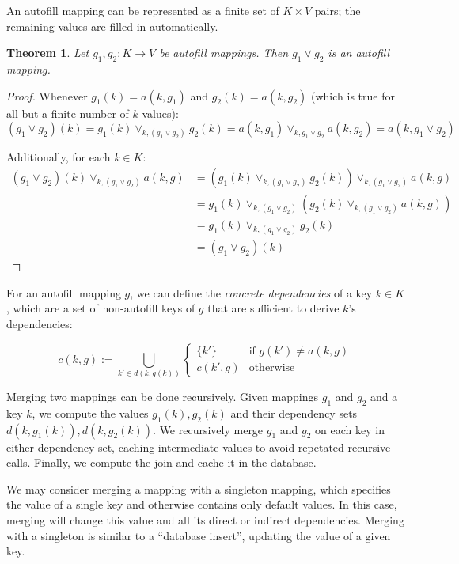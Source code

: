 \documentclass{article}
\newtheorem{theorem}{Theorem}
\begin{document}
        An autofill mapping can be represented as a finite set of $K \times V$ pairs; the remaining values are filled in automatically.

        \begin{theorem}
          Let $g_1, g_2 : K \rightarrow V$ be autofill mappings. Then $g_1 \vee g_2$ is an autofill mapping.
        \end{theorem}

        \begin{proof}

          Whenever $g_1(k) = a(k, g_1)$ and $g_2(k) = a(k, g_2)$ (which is true for all but a finite number of $k$ values):
           $$(g_1 \vee g_2)(k) = g_1(k) \vee_{k, (g_1 \vee g_2)} g_2(k) = a(k, g_1) \vee_{k, g_1 \vee g_2} a(k, g_2) = a(k, g_1 \vee g_2)$$

          Additionally, for each $k \in K$:
          \begin{align*}
            (g_1 \vee g_2)(k) \vee_{k, (g_1 \vee g_2)} a(k, g) 
            &= (g_1(k) \vee_{k, (g_1 \vee g_2)} g_2(k)) \vee_{k, (g_1 \vee g_2)} a(k, g) \\
            &= g_1(k) \vee_{k, (g_1 \vee g_2)} (g_2(k) \vee_{k, (g_1 \vee g_2)} a(k, g)) \\
            &= g_1(k) \vee_{k, (g_1 \vee g_2)} g_2(k) \\
            &= (g_1 \vee g_2)(k)
          \end{align*}
        \end{proof}

        For an autofill mapping $g$, we can define the \emph{concrete dependencies} of a key $k \in K$, which are a set of non-autofill keys of $g$ that are sufficient to derive $k$'s dependencies:

        $$c(k, g) := \bigcup_{k' \in d(k, g(k))} \begin{cases}
          \{k'\} & \text{if } g(k') \neq a(k, g) \\
          c(k', g) & \text{otherwise}
        \end{cases}  $$


        Merging two mappings can be done recursively. Given mappings $g_1$ and $g_2$ and a key $k$, we compute the values $g_1(k), g_2(k)$ and their dependency sets $d(k, g_1(k)), d(k, g_2(k))$. We recursively merge $g_1$ and $g_2$ on each key in either dependency set, caching intermediate values to avoid repetated recursive calls. Finally, we compute the join and cache it in the database.

        We may consider merging a mapping with a singleton mapping, which specifies the value of a single key and otherwise contains only default values. In this case, merging will change this value and all its direct or indirect dependencies. Merging with a singleton is similar to a ``database insert'', updating the value of a given key.
\end{document}
